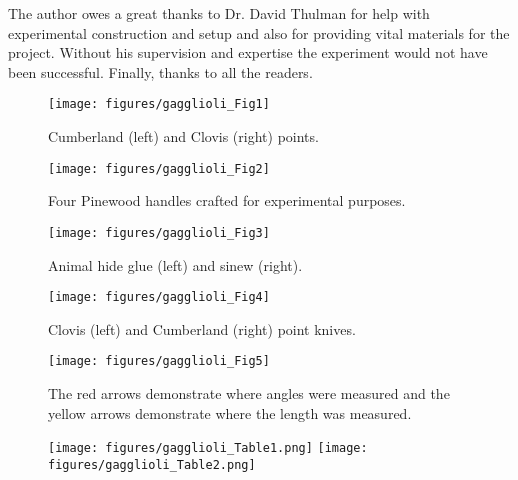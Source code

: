 \myseparator

The author owes a great thanks to Dr. David Thulman for help with experimental construction and setup and also for providing vital materials for the project. Without his supervision and expertise the experiment would not have been successful. Finally, thanks to all the readers.


\begin{figure}[!p]
	\texttt{[image: figures/gagglioli\_Fig1]}
	\centering
	\caption{Cumberland (left) and Clovis (right) points.}
	\label{fig:gagglioli_Fig1}
\end{figure}	

\begin{figure}[!p]
	\centering
	\begin{minipage}{0.45\textwidth}
		\centering
		\texttt{[image: figures/gagglioli\_Fig2]}
		\caption{Four Pinewood handles crafted for experimental purposes.}
		\label{fig:gagglioli_Fig2}
	\end{minipage}\hfill\noindent 
	\begin{minipage}{0.4\textwidth}
		\centering
		\texttt{[image: figures/gagglioli\_Fig3]}
		\caption{Animal hide glue (left) and sinew (right).}
		\label{fig:gagglioli_Fig3}
	\end{minipage}
\end{figure}

\begin{figure}[!p]
	\texttt{[image: figures/gagglioli\_Fig4]}
	\centering
	\caption{Clovis (left) and Cumberland (right) point knives.}
	\label{fig:gagglioli_Fig4}
\end{figure}

\begin{figure}[!p]
	\centering
	\texttt{[image: figures/gagglioli\_Fig5]}
	\caption{The red arrows demonstrate where angles were measured and the yellow arrows demonstrate where the length was measured.}
	\label{fig:gagglioli_Fig5}
\end{figure}

\begin{figure}[!p]
	\texttt{[image: figures/gagglioli\_Table1.png]}
	\centering
	\label{fig:Table1}
%
	\texttt{[image: figures/gagglioli\_Table2.png]}
	\centering
	\label{fig:Table2}
\end{figure}

